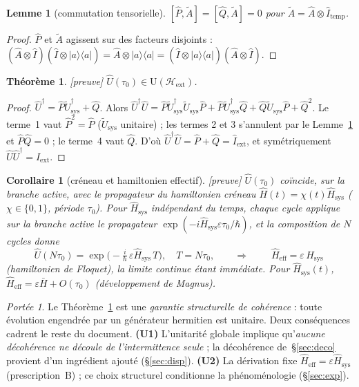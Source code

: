 \documentclass[11pt,a4paper]{article}
\newcommand{\ket}[1]{\lvert #1\rangle}
\newcommand{\bra}[1]{\langle #1\rvert}
\newcommand{\Hext}{\mathcal{H}_{\mathrm{ext}}}
\newcommand{\Hsysop}{\hat{H}_{\mathrm{sys}}}
\newcommand{\Heff}{\hat{H}_{\mathrm{eff}}}
\newcommand{\Iext}{\hat{I}_{\mathrm{ext}}}
\newcommand{\statut}[1]{{\footnotesize\textsf{[#1]}}}
\theoremstyle{plain}
\newtheorem{theorem}{Th\'eor\`eme}
\newtheorem{lemma}{Lemme}
\newtheorem{corollary}{Corollaire}
\theoremstyle{definition}
\theoremstyle{remark}
\newtheorem*{scope}{Port\'ee}
\begin{document}
\begin{lemma}[commutation tensorielle]\label{lem:comm}
$[\hat{P},\tilde{A}]=[\hat{Q},\tilde{A}]=0$ pour $\tilde{A}=\hat{A}\otimes\hat{I}_{\mathrm{temp}}$.
\end{lemma}
\begin{proof}
$\hat{P}$ et $\tilde A$ agissent sur des facteurs disjoints :
$(\hat A\otimes\hat I)(\hat I\otimes\ket{a}\bra{a})=\hat A\otimes\ket{a}\bra{a}
=(\hat I\otimes\ket{a}\bra{a})(\hat A\otimes\hat I)$.
\end{proof}

\begin{theorem}\label{thm:unit}\statut{preuve}
$\hat{U}(\tau_0)\in\mathrm{U}(\Hext)$.
\end{theorem}
\begin{proof}
$\hat{U}^\dagger=\hat{P}\tilde{U}_{\mathrm{sys}}^\dagger+\hat{Q}$. Alors
$\hat{U}^\dagger\hat{U}
=\hat{P}\tilde{U}_{\mathrm{sys}}^\dagger\tilde{U}_{\mathrm{sys}}\hat{P}
+\hat{P}\tilde{U}_{\mathrm{sys}}^\dagger\hat{Q}
+\hat{Q}\tilde{U}_{\mathrm{sys}}\hat{P}+\hat{Q}^2$.
Le terme~1 vaut $\hat P^2=\hat P$ ($\tilde U_{\mathrm{sys}}$ unitaire) ; les termes
2 et 3 s'annulent par le Lemme~\ref{lem:comm} et $\hat P\hat Q=0$ ; le terme~4 vaut
$\hat Q$. D'o\`u $\hat U^\dagger\hat U=\hat P+\hat Q=\Iext$, et sym\'etriquement
$\hat U\hat U^\dagger=\Iext$.
\end{proof}

\begin{corollary}[cr\'eneau et hamiltonien effectif]\label{cor:floquet}\statut{preuve}
$\hat U(\tau_0)$ co\"incide, sur la branche active, avec le propagateur du hamiltonien
cr\'eneau $\hat H(t)=\chi(t)\Hsysop$ ($\chi\in\{0,1\}$, p\'eriode $\tau_0$). Pour
$\Hsysop$ ind\'ependant du temps, chaque cycle applique sur la branche active le propagateur $\exp(-i\Hsysop\varepsilon\tau_0/\hbar)$, et la composition de $N$ cycles donne
\[
\hat U(N\tau_0)=\exp\!\big(-\tfrac{i}{\hbar}\,\varepsilon\Hsysop\,T\big),
\quad T=N\tau_0,
\qquad\Longrightarrow\qquad
\boxed{\;\Heff=\varepsilon\,\Hsysop\;}
\]
(hamiltonien de Floquet), la limite continue \'etant imm\'ediate. Pour $\Hsysop(t)$,
$\Heff=\varepsilon\bar{H}+O(\tau_0)$ (d\'eveloppement de Magnus).
\end{corollary}

\begin{scope}
Le Th\'eor\`eme~\ref{thm:unit} est une \emph{garantie structurelle de coh\'erence} :
toute \'evolution engendr\'ee par un g\'en\'erateur hermitien est unitaire. Deux
cons\'equences cadrent le reste du document.
\textbf{(U1)} L'unitarit\'e globale implique qu'\emph{aucune d\'ecoh\'erence ne d\'ecoule de
l'intermittence seule} ; la d\'ecoh\'erence de~\S\ref{sec:deco} provient d'un ingr\'edient
ajout\'e (\S\ref{sec:disp}). \textbf{(U2)} La d\'erivation fixe
$\Heff=\varepsilon\Hsysop$ (prescription~B) ; ce choix structurel conditionne la
ph\'enom\'enologie (\S\ref{sec:exp}).
\end{scope}
\end{document}

